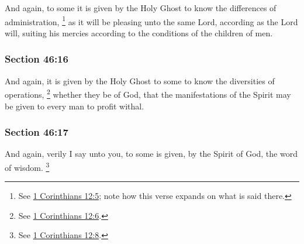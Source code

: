 		And again, to some it is given by the Holy Ghost to know the differences of administration,%
			\footnote{%
				See \hyperref[1CORINTHIANS-12-5]{1 Corinthians 12:5}; note how this verse expands on what is said there.
				}
		as it will be pleasing unto the same Lord, according as the Lord will, suiting his mercies according to the conditions of the children of men.


	\subsubsection{Section 46:16} %
		\label{DC46-16}

		And again, it is given by the Holy Ghost to some to know the diversities of operations,%
			\footnote{%
				See \hyperref[1CORINTHIANS-12-6]{1 Corinthians 12:6}.
				}
		whether they be of God, that the manifestations of the Spirit may be given to every man to profit withal.


	\subsubsection{Section 46:17} %
		\label{DC46-17}

		And again, verily I say unto you, to some is given, by the Spirit of God, the word of wisdom.%
			\footnote{%
				See \hyperref[1CORINTHIANS-12-8]{1 Corinthians 12:8}.
				} 


